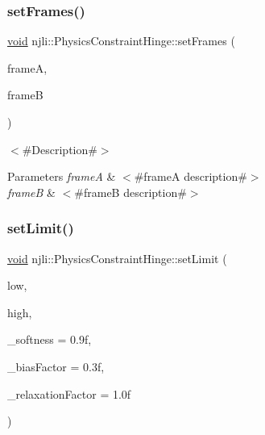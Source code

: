 \subsubsection{\texorpdfstring{set\+Frames()}{setFrames()}}
{\footnotesize\ttfamily \mbox{\hyperlink{_thread_8h_af1e856da2e658414cb2456cb6f7ebc66}{void}} njli\+::\+Physics\+Constraint\+Hinge\+::set\+Frames (\begin{DoxyParamCaption}\item[{const bt\+Transform \&}]{frameA,  }\item[{const bt\+Transform \&}]{frameB }\end{DoxyParamCaption})}

$<$\#\+Description\#$>$


\begin{DoxyParams}{Parameters}
{\em frameA} & $<$\#frameA description\#$>$ \\
\hline
{\em frameB} & $<$\#frameB description\#$>$ \\
\hline
\end{DoxyParams}
\mbox{\label{classnjli_1_1_physics_constraint_hinge_a658f010e5decd6e9dea4f239333c46de}} 
\subsubsection{\texorpdfstring{set\+Limit()}{setLimit()}}
{\footnotesize\ttfamily \mbox{\hyperlink{_thread_8h_af1e856da2e658414cb2456cb6f7ebc66}{void}} njli\+::\+Physics\+Constraint\+Hinge\+::set\+Limit (\begin{DoxyParamCaption}\item[{\mbox{\hyperlink{_util_8h_a5f6906312a689f27d70e9d086649d3fd}{f32}}}]{low,  }\item[{\mbox{\hyperlink{_util_8h_a5f6906312a689f27d70e9d086649d3fd}{f32}}}]{high,  }\item[{\mbox{\hyperlink{_util_8h_a5f6906312a689f27d70e9d086649d3fd}{f32}}}]{\+\_\+softness = {\ttfamily 0.9f},  }\item[{\mbox{\hyperlink{_util_8h_a5f6906312a689f27d70e9d086649d3fd}{f32}}}]{\+\_\+bias\+Factor = {\ttfamily 0.3f},  }\item[{\mbox{\hyperlink{_util_8h_a5f6906312a689f27d70e9d086649d3fd}{f32}}}]{\+\_\+relaxation\+Factor = {\ttfamily 1.0f} }\end{DoxyParamCaption})}

